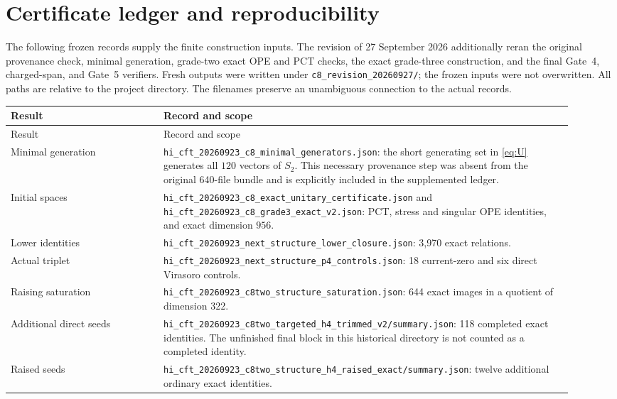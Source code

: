 \documentclass[11pt,a4paper]{article}
\theoremstyle{definition}
\newcommand{\artifact}[1]{\textnormal{\nolinkurl{#1}}}
\begin{document}
\section{Certificate ledger and reproducibility}\label{sec:ledger}
The following frozen records supply the finite construction inputs.
The revision of 27 September 2026 additionally reran the original
provenance check, minimal generation, grade-two exact OPE and PCT
checks, the exact grade-three construction, and the final Gate~4,
charged-span, and Gate~5 verifiers. Fresh outputs were written under
\artifact{c8_revision_20260927/}; the frozen inputs were not overwritten.
All paths are relative to the project directory. The filenames preserve
an unambiguous connection to the actual records.

\begin{longtable}{@{}p{0.25\linewidth}p{0.67\linewidth}@{}}
\toprule
Result & Record and scope\\
\midrule\endfirsthead
\toprule Result & Record and scope\\\midrule\endhead
\bottomrule\endfoot
Minimal generation &
\artifact{hi_cft_20260923_c8_minimal_generators.json}:
the short generating set in \eqref{eq:U} generates all $120$ vectors
of $S_2$. This necessary provenance step was absent from the original
640-file bundle and is explicitly included in the supplemented ledger.\\
Initial spaces &
\artifact{hi_cft_20260923_c8_exact_unitary_certificate.json}
and \artifact{hi_cft_20260923_c8_grade3_exact_v2.json}:
PCT, stress and singular OPE identities, and exact dimension $956$.\\
Lower identities &
\artifact{hi_cft_20260923_next_structure_lower_closure.json}:
3,970 exact relations.\\
Actual triplet &
\artifact{hi_cft_20260923_next_structure_p4_controls.json}:
18 current-zero and six direct Virasoro controls.\\
Raising saturation &
\artifact{hi_cft_20260923_c8two_structure_saturation.json}:
644 exact images in a quotient of dimension 322.\\
Additional direct seeds &
\artifact{hi_cft_20260923_c8two_targeted_h4_trimmed_v2/summary.json}:
118 completed exact identities. The unfinished final block in this
historical directory is not counted as a completed identity.\\
Raised seeds &
\artifact{hi_cft_20260923_c8two_structure_h4_raised_exact/summary.json}:
twelve additional ordinary exact identities.\\

\end{longtable}
\end{document}
